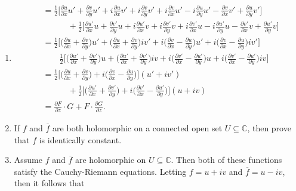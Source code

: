 \documentclass[12pt]{article}
\makeatletter
\theoremstyle{definition}
\theoremstyle{remark}
\renewenvironment{proof}[1][\proofname]{\par
  \pushQED{\qed}%
  \normalfont \topsep6\p@\@plus6\p@\relax
  \list{}{\leftmargin=0mm
          \rightmargin=4mm
          \settowidth{\itemindent}{\itshape#1}%
          \labelwidth=\itemindent
          \parsep=0pt \listparindent=\parindent 
  }
  \item[\hskip\labelsep
        \itshape
    #1\@addpunct{.}]\ignorespaces
}{%
  \popQED\endlist\@endpefalse
}
\let\oldproofname=\proofname
\renewcommand{\proofname}{\bf{\textit{\oldproofname}}}
\makeatother
\begin{document}
\begin{enumerate}[leftmargin=*]
\begin{proof}
\begin{equation*}
\begin{split}
                            &=\frac{1}{2}\bigg[\frac{\partial u}{\partial x}u'+\frac{\partial v}{\partial y}u'+i\frac{\partial u}{\partial x}v'+i\frac{\partial v}{\partial y}v'+i\frac{\partial v}{\partial x}u'-i\frac{\partial u}{\partial y}u'-\frac{\partial v}{\partial x}v'+\frac{\partial u}{\partial y}v'\bigg] \\ &\quad\quad\quad+\frac{1}{2}\bigg[\frac{\partial u'}{\partial x}u+\frac{\partial v'}{\partial y}u+i\frac{\partial u'}{\partial x}v+i\frac{\partial v'}{\partial y}v+i\frac{\partial v'}{\partial x}u-i\frac{\partial u'}{\partial y}u-\frac{\partial v'}{\partial x}v+\frac{\partial u'}{\partial y}v\bigg] \\
                            &=\frac{1}{2}\bigg[\bigg(\frac{\partial u}{\partial x}+\frac{\partial v}{\partial y}\bigg)u'+\bigg(\frac{\partial u}{\partial x}+\frac{\partial v}{\partial y}\bigg)iv'+i\bigg(\frac{\partial v}{\partial x}-\frac{\partial u}{\partial y}\bigg)u'+i\bigg(\frac{\partial v}{\partial x}-\frac{\partial u}{\partial y}\bigg)iv'\bigg] \\
                            &\quad\quad\frac{1}{2}\bigg[\bigg(\frac{\partial u'}{\partial x}+\frac{\partial v'}{\partial y}\bigg)u+\bigg(\frac{\partial u'}{\partial x}+\frac{\partial v'}{\partial y}\bigg)iv+i\bigg(\frac{\partial v'}{\partial x}-\frac{\partial u'}{\partial y}\bigg)u+i\bigg(\frac{\partial v'}{\partial x}-\frac{\partial u'}{\partial y}\bigg)iv\bigg] \\
                            &= \frac{1}{2}\bigg[\bigg(\frac{\partial u}{\partial x}+\frac{\partial v}{\partial y}\bigg)+i\bigg(\frac{\partial v}{\partial x}-\frac{\partial u}{\partial y}\bigg)\bigg](u'+iv')\\&\quad\quad\quad+\frac{1}{2}\bigg[\bigg(\frac{\partial u'}{\partial x}+\frac{\partial v'}{\partial y}\bigg)+i\bigg(\frac{\partial v'}{\partial x}-\frac{\partial u'}{\partial y}\bigg)\bigg](u+iv) \\
                            &=\frac{\partial F}{\partial z}\cdot G+F\cdot\frac{\partial G}{\partial z}.
                        \end{split}
                    \end{equation*}
            \end{proof}\newpage
        \item If $f$ and $\overline{f}$ are both holomorphic on a connected open set $U\subseteq\mathbb{C}$, then prove that $f$ is identically constant.
            \begin{proof}
                Assume $f$ and $\overline{f}$ are holomorphic on $U\subseteq\mathbb{C}$. Then both of these functions satisfy the Cauchy-Riemann equations. Letting $f=u+iv$ and $\overline{f}=u-iv$, then it follows that 

\end{proof}
\end{enumerate}
\end{document}
